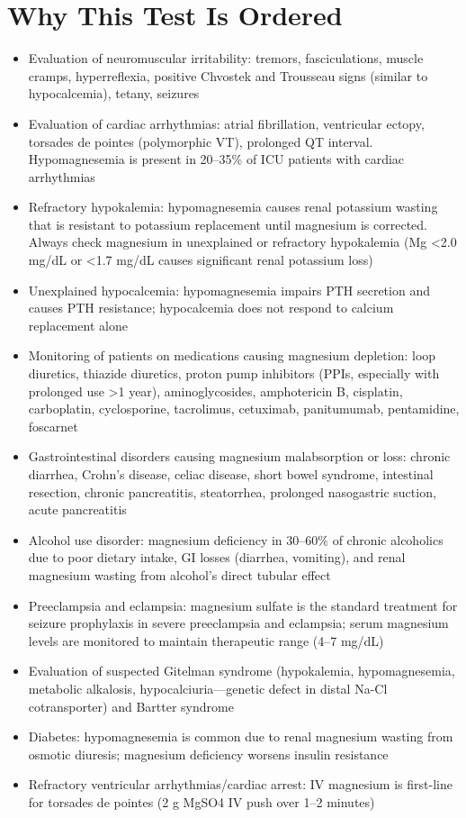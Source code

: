 \section*{Why This Test Is Ordered}
\begin{itemize}
  \item Evaluation of neuromuscular irritability: tremors, fasciculations, muscle cramps, hyperreflexia, positive Chvostek and Trousseau signs (similar to hypocalcemia), tetany, seizures
  \item Evaluation of cardiac arrhythmias: atrial fibrillation, ventricular ectopy, torsades de pointes (polymorphic VT), prolonged QT interval. Hypomagnesemia is present in 20--35\% of ICU patients with cardiac arrhythmias
  \item Refractory hypokalemia: hypomagnesemia causes renal potassium wasting that is resistant to potassium replacement until magnesium is corrected. Always check magnesium in unexplained or refractory hypokalemia (Mg <2.0 mg/dL or <1.7 mg/dL causes significant renal potassium loss)
  \item Unexplained hypocalcemia: hypomagnesemia impairs PTH secretion and causes PTH resistance; hypocalcemia does not respond to calcium replacement alone
  \item Monitoring of patients on medications causing magnesium depletion: loop diuretics, thiazide diuretics, proton pump inhibitors (PPIs, especially with prolonged use >1 year), aminoglycosides, amphotericin B, cisplatin, carboplatin, cyclosporine, tacrolimus, cetuximab, panitumumab, pentamidine, foscarnet
  \item Gastrointestinal disorders causing magnesium malabsorption or loss: chronic diarrhea, Crohn's disease, celiac disease, short bowel syndrome, intestinal resection, chronic pancreatitis, steatorrhea, prolonged nasogastric suction, acute pancreatitis
  \item Alcohol use disorder: magnesium deficiency in 30--60\% of chronic alcoholics due to poor dietary intake, GI losses (diarrhea, vomiting), and renal magnesium wasting from alcohol's direct tubular effect
  \item Preeclampsia and eclampsia: magnesium sulfate is the standard treatment for seizure prophylaxis in severe preeclampsia and eclampsia; serum magnesium levels are monitored to maintain therapeutic range (4--7 mg/dL)
  \item Evaluation of suspected Gitelman syndrome (hypokalemia, hypomagnesemia, metabolic alkalosis, hypocalciuria---genetic defect in distal Na-Cl cotransporter) and Bartter syndrome
  \item Diabetes: hypomagnesemia is common due to renal magnesium wasting from osmotic diuresis; magnesium deficiency worsens insulin resistance
  \item Refractory ventricular arrhythmias/cardiac arrest: IV magnesium is first-line for torsades de pointes (2 g MgSO4 IV push over 1--2 minutes)
\end{itemize}

